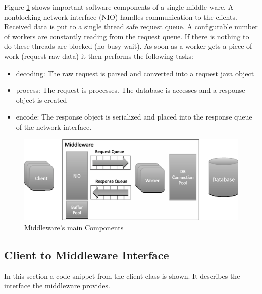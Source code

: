 \documentclass[a4paper]{article}
\begin{document}
Figure \ref{fig:middleware-threading} shows important software components of a single middle ware. A nonblocking network interface (NIO) handles communication to the clients. Received data is put to a single thread safe request queue. A configurable number of workers are constantly reading from the request queue. If there is nothing to do these threads are blocked (no busy wait). As soon as a worker gets a piece of work (request raw data) it then performs the following tasks:
\begin{itemize}
\item decoding: The raw request is parsed and converted into a request java object
\item process: The request is processes. The database is accesses and a response object is created
\item encode: The response object is serialized and placed into the response queue of the network interface.
\end{itemize}


\begin{figure}[H]
	\begin{center}
    \includegraphics[scale=0.5]{../drawings/broker-threading.eps}
  \end{center}
  \caption{Middleware's main Components}
  \label{fig:middleware-threading}
\end{figure}

\subsection{Client to Middleware Interface}
In this section a code snippet from the client class is shown. It describes the interface the middleware provides.



\end{document}
